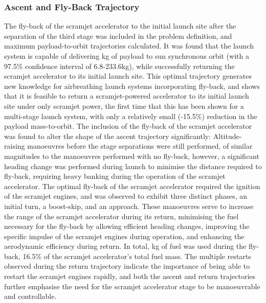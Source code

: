 \subsubsection{Ascent and Fly-Back Trajectory}
The fly-back of the scramjet accelerator to the initial launch site after the separation of the third stage was included in the problem definition, and maximum payload-to-orbit trajectories calculated. 
It was found that the launch system is capable of delivering \PayloadToOrbitStandard kg of payload to sun synchronous orbit (with a 97.5\% confidence interval of 6.8-233.6kg), while successfully returning the scramjet accelerator to its initial launch site. This optimal trajectory generates new knowledge for airbreathing launch systems incorporating fly-back, and shows that it is feasible to return a scramjet-powered accelerator to its initial launch site under only scramjet power, the first time that this has been shown for a multi-stage launch system, with only a relatively small (-15.5\%) reduction in the payload mass-to-orbit.
	The inclusion of the fly-back of the scramjet accelerator was found to alter the shape of the ascent trajectory significantly: Altitude-raising manoeuvres before the stage separations were still performed, of similar magnitudes to the manoeuvres performed with no fly-back, however, a significant heading change was performed during launch to minimise the distance required to fly-back, requiring heavy banking during the operation of the scramjet accelerator. 
The optimal fly-back of the scramjet accelerator required the ignition of the scramjet engines, and was observed to exhibit three distinct phases, an initial turn, a boost-skip, and an approach. 
These manoeuvres serve to increase the range of the scramjet accelerator during its return, minimising the fuel necessary for the fly-back by allowing efficient heading changes, improving the specific impulse of the scramjet engines during operation, and enhancing the aerodynamic efficiency during return.
 In total, \returnFuelStandard kg of fuel was used during the fly-back, 16.5\% of the scramjet accelerator's total fuel mass. The multiple restarts observed during the return trajectory indicate the importance of being able to restart the scramjet engines rapidly, and both the ascent and return trajectories further emphasise the need for the scramjet accelerator stage to be manoeuvrable and controllable. 
 
